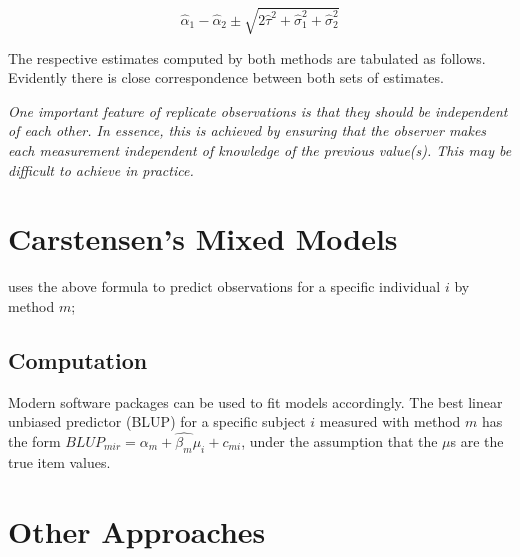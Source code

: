 \documentclass[12pt, a4paper]{report}
\theoremstyle{plain}
\theoremstyle{definition}
\theoremstyle{remark}
\begin{document}
\[
\hat{\alpha}_1 - \hat{\alpha}_2 \pm \sqrt{2 \hat{\tau}^2 +
	\hat{\sigma}^2_1 + \hat{\sigma}^2_2}
\]

The respective estimates computed by both methods are tabulated as follows. Evidently there is close correspondence between both sets of estimates.



\emph{
	One important feature of replicate observations is that they should be independent
	of each other. In essence, this is achieved by ensuring that the observer makes each
	measurement independent of knowledge of the previous value(s). This may be difficult
	to achieve in practice.}





\section{Carstensen's Mixed Models}




\citet{BXC2004} uses the above formula to predict observations for a specific individual $i$ by method $m$;





\subsection{Computation} Modern software
packages can be used to fit models accordingly. The best linear
unbiased predictor (BLUP) for a specific subject $i$ measured with
method $m$ has the form $BLUP_{mir} = \hat{\alpha_{m}} +
\hat{\beta_{m}}\mu_{i} + c_{mi}$, under the assumption that the
$\mu$s are the true item values.




\section{Other Approaches}
\end{document}

